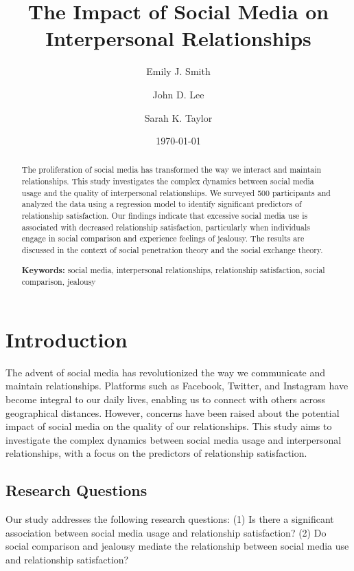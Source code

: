 \documentclass[12pt,a4paper]{article}
\title{The Impact of Social Media on Interpersonal Relationships}
\author{Emily J. Smith \and John D. Lee \and Sarah K. Taylor}
\date{\today}
\begin{document}
\maketitle
\thispagestyle{empty}

\begin{abstract}
\setlength{\parindent}{0pt}
\noindent
The proliferation of social media has transformed the way we interact and maintain relationships. This study investigates the complex dynamics between social media usage and the quality of interpersonal relationships. We surveyed 500 participants and analyzed the data using a regression model to identify significant predictors of relationship satisfaction. Our findings indicate that excessive social media use is associated with decreased relationship satisfaction, particularly when individuals engage in social comparison and experience feelings of jealousy. The results are discussed in the context of social penetration theory and the social exchange theory.

\textbf{Keywords:} social media, interpersonal relationships, relationship satisfaction, social comparison, jealousy
\end{abstract}

\newpage
\tableofcontents
\newpage

\twocolumn
\section{Introduction}
The advent of social media has revolutionized the way we communicate and maintain relationships. Platforms such as Facebook, Twitter, and Instagram have become integral to our daily lives, enabling us to connect with others across geographical distances. However, concerns have been raised about the potential impact of social media on the quality of our relationships. This study aims to investigate the complex dynamics between social media usage and interpersonal relationships, with a focus on the predictors of relationship satisfaction.

\subsection{Research Questions}
Our study addresses the following research questions: (1) Is there a significant association between social media usage and relationship satisfaction? (2) Do social comparison and jealousy mediate the relationship between social media use and relationship satisfaction?
\end{document}
